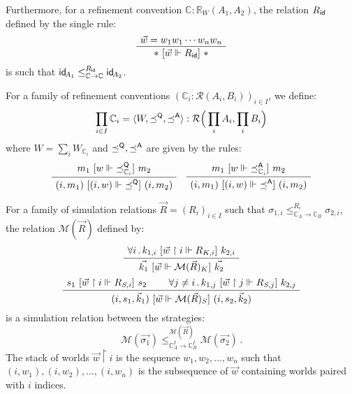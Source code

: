 { \color{gray} %

Furthermore,
for a refinement convention
$\mathbb{C} : \mathbb{R}_{W}(A_1, A_2)$,
the relation $R_{ \mathsf{id} }$ defined by the single rule:
\[
    \AxiomC{$\vec{w} = w_1 w_1 \cdots w_n w_n$}
    \UnaryInfC{$* \ifr{\vec{w} \Vdash R_\kw{id}} *$}
    \DisplayProof
\]
is such that
$ \mathsf{id} _{\!A_1} \le_{\mathbb{C} \rightarrow \mathbb{C}}^{R_{ \mathsf{id} }}  \mathsf{id} _{\!A_2}$.

\begin{definition}
For a family of refinement conventions
$(\mathbb{C}_i : \mathcal{R}(A_i, B_i))_{i \in I}$,
we define:
\[ \prod_{i \in I} \mathbb{C}_i =
   \langle W, {\preceq}^{ \mathsf{Q} }, {\preceq}^{ \mathsf{A} } \rangle :
   \mathcal{R}\Big(\prod_i A_i, \prod_i B_i \Big) \]
where
$W = \sum_i W_{\mathbb{C}_i}$ and
$\preceq^{ \mathsf{Q} }, \preceq^{ \mathsf{A} }$
are given by the rules:
\[
    \small
    \AxiomC{$m_1 \ifr{w \Vdash {\preceq}_{\mathbb{C}_i}^\kw{Q}} m_2$}
    \UnaryInfC{$(i, m_1) \ifr{(i, w) \Vdash {\preceq}^\kw{Q}} (i, m_2)$}
    \DisplayProof
    \quad
    \AxiomC{$m_1 \ifr{w \Vdash {\preceq}_{\mathbb{C}_i}^\kw{A}} m_2$}
    \UnaryInfC{$(i, m_1) \ifr{(i, w) \Vdash {\preceq}^\kw{A}} (i, m_2)$}
    \DisplayProof
\]
\end{definition}

\begin{lemma} %
For a family of simulation relations $\vec{R} = (R_i)_{i \in I}$ such that
$\sigma_{1,i} \le_{\mathbb{C}_A \rightarrow \mathbb{C}_B}^{R_i} \sigma_{2,i}$,
the relation $\mathcal{M}(\vec{R})$ defined by:
\begin{gather*}
  \AxiomC{$\forall i \,.\,
    k_{1,i} \ifr{\vec{w} \restriction i \Vdash R_{K,i}} k_{2,i}$}
  \UnaryInfC{$\vec{k_1} \ifr{\vec{w} \Vdash \mathcal{M}(\vec{R})_K} \vec{k_2}$}
  \DisplayProof
  \\[.5ex]
  \AxiomC{$s_1 \ifr{\vec{w} \restriction i \Vdash R_{S,i}} s_2$}
  \AxiomC{$\forall j \ne i \,.\,
    k_{1,j} \ifr{\vec{w} \restriction j \Vdash R_{S,j}} k_{2,j}$}
  \BinaryInfC{$(i, s_1, \vec{k}_1)
    \ifr{\vec{w} \Vdash \mathcal{M}(\vec{R})_S}
    (i, s_2, \vec{k}_2)$}
  \DisplayProof
\end{gather*}
is a simulation relation between the strategies:
\[
  \mathcal{M}(\vec{\sigma_1})
  \le_{\mathbb{C}_A^I \rightarrow \mathbb{C}_B^I}^{\mathcal{M}(\vec{R})}
  \mathcal{M}(\vec{\sigma_2}) \, .
\]
The stack of worlds $\vec{w} \restriction i$
is the sequence $w_1, w_2, \ldots, w_n$
such that $(i, w_1), (i, w_2), \ldots, (i, w_n)$
is the subsequence of $\vec{w}$ containing worlds
paired with $i$ indices.
\end{lemma}

}
